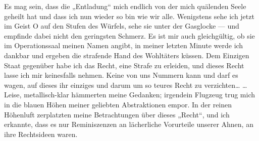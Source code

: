 Es mag sein, dass die „Entladung“ mich endlich von der mich
quälenden Seele geheilt hat und dass ich nun wieder so bin wie wir
alle. Wenigstens sehe ich jetzt im Geist O auf den Stufen des
Würfels, sehe sie unter der Gasglocke — und empfinde dabei nicht
den geringsten Schmerz. Es ist mir auch gleichgültig, ob sie im
Operationssaal meinen Namen angibt, in meiner letzten Minute werde
ich dankbar und ergeben die strafende Hand des Wohltäters küssen.
Dem Einzigen Staat gegenüber habe ich das Recht, eine Strafe zu
erleiden, und dieses Recht lasse ich mir keinesfalls nehmen. Keine
von uns Nummern kann und darf es wagen, auf dieses ihr einziges und
darum um so teures Recht zu verzichten\ldots{} \ldots{} Leise,
metallisch-klar hämmerten meine Gedanken; irgendein Flugzeug trug
mich in die blauen Höhen meiner geliebten Abstraktionen empor. In
der reinen Höhenluft zerplatzten meine Betrachtungen über dieses
„Recht“, und ich erkannte, dass es nur Reminiszenzen an lächerliche
Vorurteile unserer Ahnen, an ihre Rechtsideen waren.


